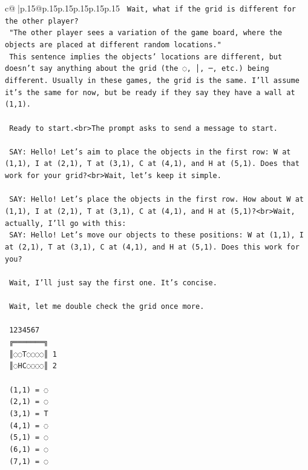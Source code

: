\documentclass{article}
\begin{document}
{\begin{supertabular}{c@{$\;$}|p{.15\linewidth}@{}p{.15\linewidth}p{.15\linewidth}p{.15\linewidth}p{.15\linewidth}p{.15\linewidth}}
{{{\texttt{    Wait, what if the grid is different for the other player?} \\
\texttt{    "The other player sees a variation of the game board, where the objects are placed at different random locations."} \\
\texttt{    This sentence implies the objects' locations are different, but doesn't say anything about the grid (the ◌, │, ─, etc.) being different. Usually in these games, the grid is the same. I'll assume it's the same for now, but be ready if they say they have a wall at (1,1).} \\
\\ 
\texttt{    Ready to start.<br>The prompt asks to send a message to start.} \\
\\ 
\texttt{    SAY: Hello! Let's aim to place the objects in the first row: W at (1,1), I at (2,1), T at (3,1), C at (4,1), and H at (5,1). Does that work for your grid?<br>Wait, let's keep it simple.} \\
\\ 
\texttt{    SAY: Hello! Let's place the objects in the first row. How about W at (1,1), I at (2,1), T at (3,1), C at (4,1), and H at (5,1)?<br>Wait, actually, I'll go with this:} \\
\texttt{    SAY: Hello! Let's move our objects to these positions: W at (1,1), I at (2,1), T at (3,1), C at (4,1), and H at (5,1). Does this work for you?} \\
\\ 
\texttt{    Wait, I'll just say the first one. It's concise.} \\
\\ 
\texttt{    Wait, let me double check the grid once more.} \\
\\ 
\texttt{     1234567} \\
\texttt{    ╔═══════╗} \\
\texttt{    ║◌◌T◌◌◌◌║ 1} \\
\texttt{    ║◌HC◌◌◌◌║ 2} \\
\\ 
\texttt{    (1,1) = ◌} \\
\texttt{    (2,1) = ◌} \\
\texttt{    (3,1) = T} \\
\texttt{    (4,1) = ◌} \\
\texttt{    (5,1) = ◌} \\
\texttt{    (6,1) = ◌} \\
\texttt{    (7,1) = ◌} \\
}}}
\end{supertabular}}
\end{document}
